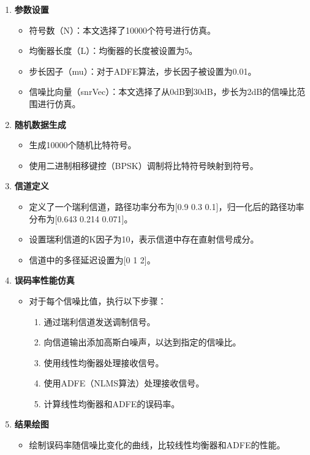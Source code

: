 \documentclass[UTF8,a4paper,12pt]{ctexart}
\numberwithin{equation}{section}
\begin{document}
	\begin{enumerate}
		\item \textbf{参数设置}
		\begin{itemize}
			\item 符号数（N）：本文选择了10000个符号进行仿真。
			\item 均衡器长度（L）：均衡器的长度被设置为5。
			\item 步长因子（mu）：对于ADFE算法，步长因子被设置为0.01。
			\item 信噪比向量（snrVec）：本文选择了从0dB到30dB，步长为2dB的信噪比范围进行仿真。
		\end{itemize}
		
		\item \textbf{随机数据生成}
		\begin{itemize}
			\item 生成10000个随机比特符号。
			\item 使用二进制相移键控（BPSK）调制将比特符号映射到符号。
		\end{itemize}
		
		\item \textbf{信道定义}
		\begin{itemize}
			\item 定义了一个瑞利信道，路径功率分布为[0.9 0.3 0.1]，归一化后的路径功率分布为[0.643 0.214 0.071]。
			\item 设置瑞利信道的K因子为10，表示信道中存在直射信号成分。
			\item 信道中的多径延迟设置为[0 1 2]。
		\end{itemize}
		
		\item \textbf{误码率性能仿真}
		\begin{itemize}
			\item 对于每个信噪比值，执行以下步骤：
			\begin{enumerate}
				\item 通过瑞利信道发送调制信号。
				\item 向信道输出添加高斯白噪声，以达到指定的信噪比。
				\item 使用线性均衡器处理接收信号。
				\item 使用ADFE（NLMS算法）处理接收信号。
				\item 计算线性均衡器和ADFE的误码率。
			\end{enumerate}
		\end{itemize}
		
		\item \textbf{结果绘图}
		\begin{itemize}
			\item 绘制误码率随信噪比变化的曲线，比较线性均衡器和ADFE的性能。
		\end{itemize}
		

\end{enumerate}
\end{document}

